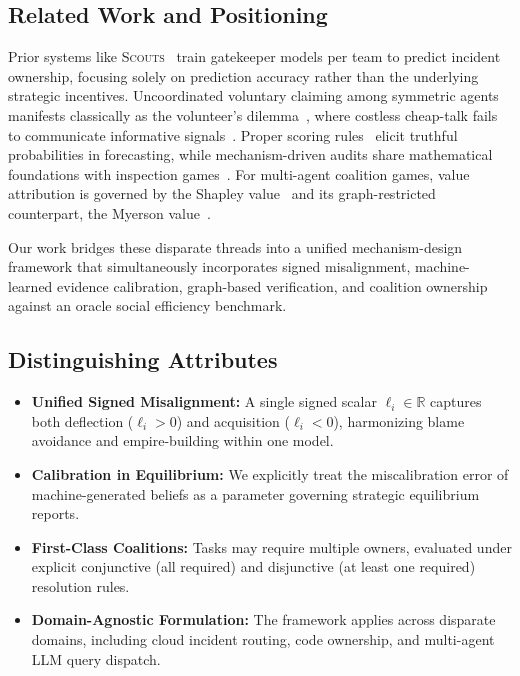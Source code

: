 \documentclass{article}
\theoremstyle{definition}
\begin{document}
\subsection{Related Work and Positioning}
Prior systems like \textsc{Scouts}~\cite{gao2020scouts} train gatekeeper models per team to predict incident ownership, focusing solely on prediction accuracy rather than the underlying strategic incentives. Uncoordinated voluntary claiming among symmetric agents manifests classically as the volunteer's dilemma~\cite{diekmann1985volunteer}, where costless cheap-talk fails to communicate informative signals~\cite{crawford1982strategic}. Proper scoring rules~\cite{brier1950verification,gneiting2007strictly} elicit truthful probabilities in forecasting, while mechanism-driven audits share mathematical foundations with inspection games~\cite{avenhaus2002inspection}. For multi-agent coalition games, value attribution is governed by the Shapley value~\cite{shapley1953value} and its graph-restricted counterpart, the Myerson value~\cite{myerson1977graphs}. 

Our work bridges these disparate threads into a unified mechanism-design framework that simultaneously incorporates signed misalignment, machine-learned evidence calibration, graph-based verification, and coalition ownership against an oracle social efficiency benchmark.

\subsection{Distinguishing Attributes}
\begin{itemize}
    \item \textbf{Unified Signed Misalignment:} A single signed scalar $\ell_i \in \mathbb{R}$ captures both deflection ($\ell_i > 0$) and acquisition ($\ell_i < 0$), harmonizing blame avoidance and empire-building within one model.
    \item \textbf{Calibration in Equilibrium:} We explicitly treat the miscalibration error of machine-generated beliefs as a parameter governing strategic equilibrium reports.
    \item \textbf{First-Class Coalitions:} Tasks may require multiple owners, evaluated under explicit conjunctive (all required) and disjunctive (at least one required) resolution rules.
    \item \textbf{Domain-Agnostic Formulation:} The framework applies across disparate domains, including cloud incident routing, code ownership, and multi-agent LLM query dispatch.
\end{itemize}
\end{document}
